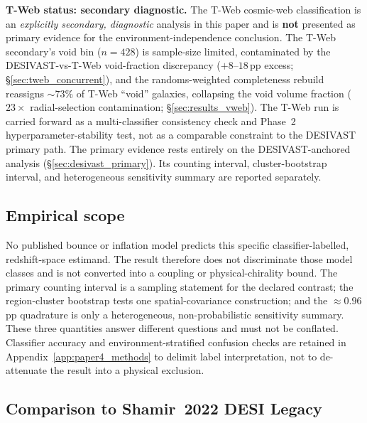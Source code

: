 \documentclass[aps,prd,twocolumn,superscriptaddress,showpacs,preprintnumbers,nofootinbib,longbibliography,floatfix]{revtex4-2}
\begin{document}
\textbf{T-Web status: secondary diagnostic.} The T-Web
cosmic-web classification is an \emph{explicitly secondary, diagnostic}
analysis in this paper and is \textbf{not} presented as primary
evidence for the environment-independence conclusion. The T-Web
secondary's void bin ($n=428$) is sample-size limited, contaminated by
the DESIVAST-vs-T-Web void-fraction discrepancy ($+8$--$18$\,pp excess;
\S\ref{sec:tweb_concurrent}), and the randoms-weighted completeness
rebuild reassigns ${\sim}73\%$ of T-Web ``void'' galaxies, collapsing
the void volume fraction ($23\times$ radial-selection contamination;
\S\ref{sec:results_vweb}). The T-Web run is carried forward as a
multi-classifier consistency check and Phase~2 hyperparameter-stability
test, not as a comparable constraint to the DESIVAST primary path.
The primary evidence rests entirely on the DESIVAST-anchored analysis
(\S\ref{sec:desivast_primary}). Its counting interval, cluster-bootstrap
interval, and heterogeneous sensitivity summary are reported separately.

\subsection{Empirical scope}

No published bounce or inflation model predicts this specific
classifier-labelled, redshift-space estimand. The result therefore does
not discriminate those model classes and is not converted into a
coupling or physical-chirality bound. The primary counting interval is a
sampling statement for the declared contrast; the region-cluster
bootstrap tests one spatial-covariance construction; and the
${\approx}0.96$\,pp quadrature is only a heterogeneous,
non-probabilistic sensitivity summary. These three quantities answer
different questions and must not be conflated. Classifier accuracy and
environment-stratified confusion checks are retained in
Appendix~\ref{app:paper4_methods} to delimit label interpretation, not to
de-attenuate the result into a physical exclusion.

\subsection{Comparison to Shamir~2022 DESI Legacy}
\end{document}

